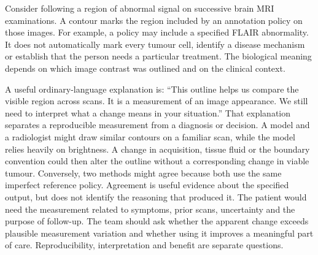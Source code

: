 \biomedicalanswer
{}
Consider following a region of abnormal signal on successive brain MRI examinations. A contour marks the region included by an annotation policy on those images. For example, a policy may include a specified FLAIR abnormality. It does not automatically mark every tumour cell, identify a disease mechanism or establish that the person needs a particular treatment. The biological meaning depends on which image contrast was outlined and on the clinical context.

A useful ordinary-language explanation is: ``This outline helps us compare the visible region across scans. It is a measurement of an image appearance. We still need to interpret what a change means in your situation.'' That explanation separates a reproducible measurement from a diagnosis or decision.
A model and a radiologist might draw similar contours on a familiar scan, while the model relies heavily on brightness. A change in acquisition, tissue fluid or the boundary convention could then alter the outline without a corresponding change in viable tumour. Conversely, two methods might agree because both use the same imperfect reference policy. Agreement is useful evidence about the specified output, but does not identify the reasoning that produced it.
The patient would need the measurement related to symptoms, prior scans, uncertainty and the purpose of follow-up. The team should ask whether the apparent change exceeds plausible measurement variation and whether using it improves a meaningful part of care. Reproducibility, interpretation and benefit are separate questions.

